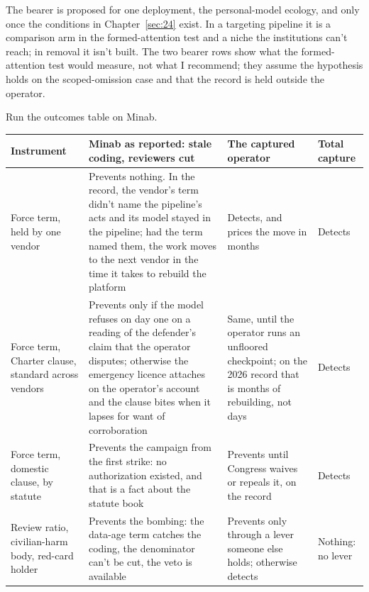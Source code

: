The bearer is proposed for one deployment, the personal-model ecology, and only once the conditions in Chapter~\ref{sec:24} exist. In a targeting pipeline it is a comparison arm in the formed-attention test and a niche the institutions can't reach; in removal it isn't built. The two bearer rows show what the formed-attention test would measure, not what I recommend; they assume the hypothesis holds on the scoped-omission case and that the record is held outside the operator.

Run the outcomes table on Minab.

\begingroup\small\renewcommand{\arraystretch}{1.12}
\begin{longtable}{@{}>{\raggedright\arraybackslash}p{}>{\raggedright\arraybackslash}p{}>{\raggedright\arraybackslash}p{}>{\raggedright\arraybackslash}p{}@{}}
\hline
\textbf{Instrument} & \textbf{Minab as reported: stale coding, reviewers cut} & \textbf{The captured operator} & \textbf{Total capture} \\
\hline
\endhead
Force term, held by one vendor & Prevents nothing. In the record, the vendor's term didn't name the pipeline's acts and its model stayed in the pipeline; had the term named them, the work moves to the next vendor in the time it takes to rebuild the platform & Detects, and prices the move in months & Detects \\ \hline
Force term, Charter clause, standard across vendors & Prevents only if the model refuses on day one on a reading of the defender's claim that the operator disputes; otherwise the emergency licence attaches on the operator's account and the clause bites when it lapses for want of corroboration & Same, until the operator runs an unfloored checkpoint; on the 2026 record that is months of rebuilding, not days & Detects \\ \hline
Force term, domestic clause, by statute & Prevents the campaign from the first strike: no authorization existed, and that is a fact about the statute book & Prevents until Congress waives or repeals it, on the record & Detects \\ \hline
Review ratio, civilian-harm body, red-card holder & Prevents the bombing: the data-age term catches the coding, the denominator can't be cut, the veto is available & Prevents only through a lever someone else holds; otherwise detects & Nothing: no lever \\ \hline

\end{longtable}
